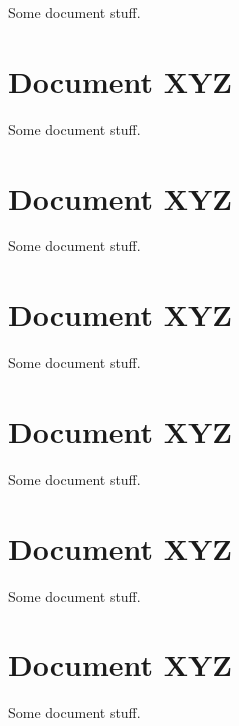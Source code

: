 \documentclass[oneside]{book}
\begin{document}
Some document stuff.


\chapter{Document XYZ}

Some document stuff.


\chapter{Document XYZ}

Some document stuff.


\chapter{Document XYZ}

Some document stuff.


\chapter{Document XYZ}

Some document stuff.


\chapter{Document XYZ}

Some document stuff.


\chapter{Document XYZ}

Some document stuff.

\end{document}
